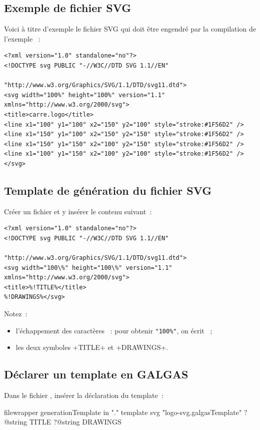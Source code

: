 \subsection{Exemple de fichier SVG}
Voici à titre d'exemple le fichier SVG qui doit être engendré par la compilation de l'exemple ~:

{\singlespacing
\begin{verbatim}
<?xml version="1.0" standalone="no"?>
<!DOCTYPE svg PUBLIC "-//W3C//DTD SVG 1.1//EN"
                              "http://www.w3.org/Graphics/SVG/1.1/DTD/svg11.dtd">
<svg width="100%" height="100%" version="1.1" xmlns="http://www.w3.org/2000/svg">
<title>carre.logo</title>
<line x1="100" y1="100" x2="150" y2="100" style="stroke:#1F56D2" />
<line x1="150" y1="100" x2="150" y2="150" style="stroke:#1F56D2" />
<line x1="150" y1="150" x2="100" y2="150" style="stroke:#1F56D2" />
<line x1="100" y1="150" x2="100" y2="100" style="stroke:#1F56D2" />
</svg>
\end{verbatim}
}

\subsection{Template de génération du fichier SVG}
Créer un fichier  et y insérer le contenu suivant~:
{\singlespacing
\begin{verbatim}
<?xml version="1.0" standalone="no"?>
<!DOCTYPE svg PUBLIC "-//W3C//DTD SVG 1.1//EN"
                                "http://www.w3.org/Graphics/SVG/1.1/DTD/svg11.dtd">
<svg width="100\%" height="100\%" version="1.1" xmlns="http://www.w3.org/2000/svg">
<title>%!TITLE%</title>
%!DRAWINGS%</svg>
\end{verbatim}
}


Notez~:
\begin{itemize}
  \item l'échappement des caractères \tpp{\%}~: pour obtenir \texttt{"100\%"}, on écrit ~;
  \item les deux symboles \ggst+TITLE+ et \ggst+DRAWINGS+.
\end{itemize}

\subsection{Déclarer un template en GALGAS}
Dans le fichier , insérer la déclaration du template~:
\begin{galgas3}
filewrapper generationTemplate in "." {
}{
}{
  template svg "logo-svg.galgasTemplate"
    ?@string TITLE
    ?@string DRAWINGS
}
\end{galgas3}

